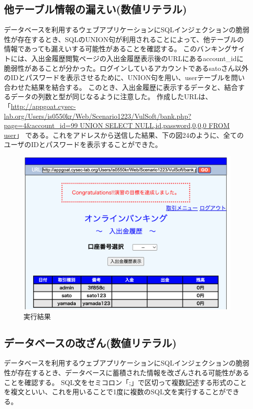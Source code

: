 \documentclass[dvipdfmx,autodetect-engine,titlepage]{jsarticle}
\begin{document}
\subsection{他テーブル情報の漏えい(数値リテラル)}
データベースを利用するウェブアプリケーションにSQLインジェクションの脆弱性が存在するとき、SQLのUNION句が利用されることによって、他テーブルの情報であっても漏えいする可能性があることを確認する。
このバンキングサイトには、入出金履歴閲覧ページの入出金履歴表示後のURLにあるaccount\_idに脆弱性があることが分かった。ログインしているアカウントであるsatoさん以外のIDとパスワードを表示させるために、UNION句を用い、userテーブルを問い合わせた結果を結合する。
このとき、入出金履歴に表示するデータと、結合するデータの列数と型が同じなるように注意した。
作成したURLは、「\url{http://appgoat.cysec-lab.org/Users/is0550kr/Web/Scenario1223/VulSoft/bank.php?page=4&account_id=99 UNION SELECT NULL,id,password,0,0,0 FROM user}」
である。これをアドレスから送信した結果、下の図24のように、全てのユーザのIDとパスワードを表示することができた。

\begin{figure}[H]
  \centering
  \includegraphics[scale=0.32]{sql8.png} 
  \caption{実行結果}\label{fig:図24}
\end{figure}

\subsection{データベースの改ざん(数値リテラル)}
データベースを利用するウェブアプリケーションにSQLインジェクションの脆弱性が存在するとき、データベースに蓄積された情報を改ざんされる可能性があることを確認する。
SQL文をセミコロン「;」で区切って複数記述する形式のことを複文といい、これを用いることで1度に複数のSQL文を実行することができる。\\\\
\end{document}
